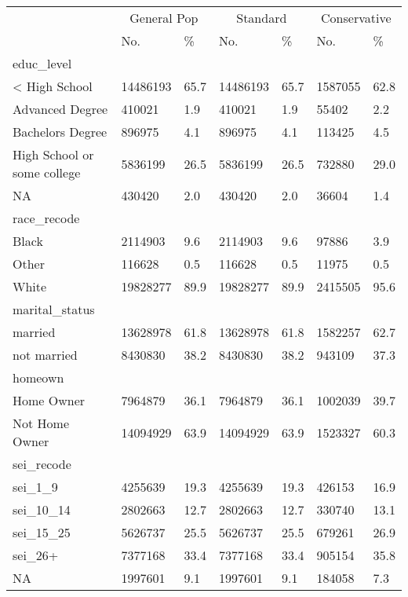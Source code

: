 \begin{tabular}{lll|ll|ll}
\toprule
& \multicolumn{2}{c}{General Pop} & \multicolumn{2}{c}{Standard} & \multicolumn{2}{c}{Conservative} \\ 
 \cmidrule(lr){2-3}\cmidrule(lr){4-5}\cmidrule(lr){6-7}
 & No. & \% & No. & \% & No. & \% \\ 
\midrule
\multicolumn{1}{l}{educ\_level} \\ 
\midrule
< High School & 14486193 & 65.7 & 14486193 & 65.7 & 1587055 & 62.8 \\ 
Advanced Degree & 410021 & 1.9 & 410021 & 1.9 & 55402 & 2.2 \\ 
Bachelors Degree & 896975 & 4.1 & 896975 & 4.1 & 113425 & 4.5 \\ 
High School or some college & 5836199 & 26.5 & 5836199 & 26.5 & 732880 & 29.0 \\ 
NA & 430420 & 2.0 & 430420 & 2.0 & 36604 & 1.4 \\ 
\midrule
\multicolumn{1}{l}{race\_recode} \\ 
\midrule
Black & 2114903 & 9.6 & 2114903 & 9.6 & 97886 & 3.9 \\ 
Other & 116628 & 0.5 & 116628 & 0.5 & 11975 & 0.5 \\ 
White & 19828277 & 89.9 & 19828277 & 89.9 & 2415505 & 95.6 \\ 
\midrule
\multicolumn{1}{l}{marital\_status} \\ 
\midrule
married & 13628978 & 61.8 & 13628978 & 61.8 & 1582257 & 62.7 \\ 
not married & 8430830 & 38.2 & 8430830 & 38.2 & 943109 & 37.3 \\ 
\midrule
\multicolumn{1}{l}{homeown} \\ 
\midrule
Home Owner & 7964879 & 36.1 & 7964879 & 36.1 & 1002039 & 39.7 \\ 
Not Home Owner & 14094929 & 63.9 & 14094929 & 63.9 & 1523327 & 60.3 \\ 
\midrule
\multicolumn{1}{l}{sei\_recode} \\ 
\midrule
sei\_1\_9 & 4255639 & 19.3 & 4255639 & 19.3 & 426153 & 16.9 \\ 
sei\_10\_14 & 2802663 & 12.7 & 2802663 & 12.7 & 330740 & 13.1 \\ 
sei\_15\_25 & 5626737 & 25.5 & 5626737 & 25.5 & 679261 & 26.9 \\ 
sei\_26+ & 7377168 & 33.4 & 7377168 & 33.4 & 905154 & 35.8 \\ 
NA & 1997601 & 9.1 & 1997601 & 9.1 & 184058 & 7.3 \\ 
\midrule

\end{tabular}
